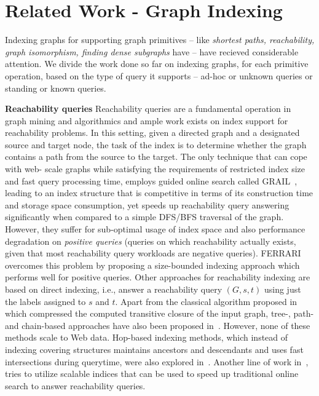 \section{Related Work - Graph Indexing}
\label{sec:rel-work-indexing}

Indexing graphs for supporting graph primitives -- like \emph{shortest paths, reachability, graph isomorphism, finding dense subgraphs} have -- have recieved considerable attention. We divide the work done so far on indexing graphs, for each primitive operation, based on the type of query it supports -- ad-hoc or unknown queries or standing or known queries. 

\textbf{Reachability queries} Reachability queries are a fundamental operation in graph mining and algorithmics and ample work exists on index support for reachability problems. In this setting, given a directed graph and a designated source and target node, the task of the index is to determine whether the graph contains a path from the source to the target. The only technique that can cope with web- scale graphs while satisfying the requirements of restricted index size and fast query processing time, employs guided online search called GRAIL~\cite{yildirim2012grail}, leading to an index structure that is competitive in terms of its construction time and storage space consumption, yet speeds up reachability query answering significantly when compared to a simple DFS/BFS traversal of the graph. However, they suffer for sub-optimal usage of index space and also performance degradation on \emph{positive queries} (queries on which reachability actually exists, given that most reachability query workloads are negative queries). FERRARI~\cite{seufert2013ferrari} overcomes this problem by proposing a size-bounded indexing approach which performs well for positive queries. Other approaches for reachability indexing are based on direct indexing, i.e., answer a reachability query $(G, s, t)$ using just the labels assigned to $s$ and $t$. Apart from the classical algorithm proposed in~\cite{agrawal1989efficient} which compressed the computed transitive closure of the input graph, tree-, path- and chain-based approaches have also been proposed in~\cite{chen2008efficient,jagadish1990compression,jin2011path,wang2006dual}. However, none of these methods scale to Web data. Hop-based indexing methods, which instead of indexing covering structures maintains ancestors and descendants and uses fast intersections during querytime, were also explored in~\cite{cohen2003reachability,jin20093,schenkel2004hopi}. Another line of work in~\cite{trissl2007fast,yildirim2012grail}, tries to utilize scalable indices that can be used to speed up traditional online search to answer reachability queries.

